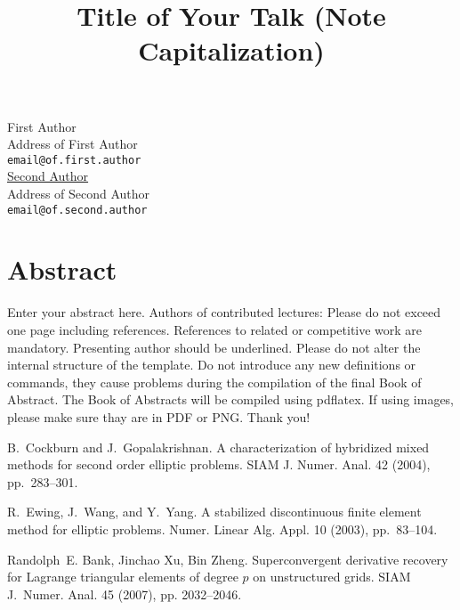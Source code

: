 \documentclass[article,A4,11pt]{llncs}%
\begin{document}

\title{Title of Your Talk (Note Capitalization)}
\author{} \institute{} %
\maketitle
\begin{center}
{\large First Author}\\
Address of First Author\\
{\tt email@of.first.author}\\
\vspace{4mm} %
{\large \underline{Second Author}}\\
Address of Second Author\\
{\tt email@of.second.author}
\end{center}

\section*{Abstract}

Enter your abstract here. Authors of contributed lectures: Please do not 
exceed one page including references. References to related or 
competitive work are mandatory. Presenting author should be underlined. 
Please do not alter the internal structure of the template. Do not 
introduce any new definitions or commands, they cause problems during the 
compilation of the final Book of Abstract. The Book of Abstracts will be 
compiled using pdflatex. If using images, please make sure thay are
in PDF or PNG. Thank you!



\begin{thebibliography}{10}

{\sc B.~Cockburn and J.~Gopalakrishnan}. {A characterization of hybridized
  mixed methods for second order elliptic problems}. SIAM J. Numer. Anal. 42
  (2004), pp.~283--301.

{\sc R.~Ewing, J.~Wang, and Y.~Yang}. {A stabilized discontinuous finite
  element method for elliptic problems}. Numer. Linear Alg. Appl. 10 (2003),
  pp.~83--104.

{\sc Randolph~E. Bank, Jinchao Xu, Bin Zheng}.
\newblock Superconvergent derivative recovery for {Lagrange} triangular
  elements of degree $p$ on unstructured grids.
\newblock SIAM J.~Numer. Anal. 45 (2007), pp. 2032--2046. 

\end{thebibliography}

\end{document}
